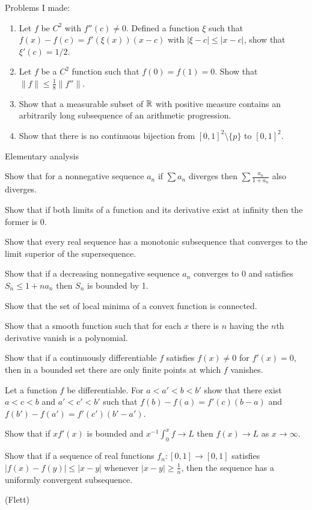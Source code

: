 \documentclass[11pt]{article}
\begin{document}
Problems I made:
\begin{enumerate}
\item Let $f$ be $C^2$ with $f''(c)\ne0$. Defined a function $\xi$ such that $f(x)-f(c)=f'(\xi(x))(x-c)$ with $|\xi-c|\le|x-c|$, show that $\xi'(c)=1/2$.
\item Let $f$ be a $C^2$ function such that $f(0)=f(1)=0$. Show that $\|f\|\le\frac18\|f''\|$.
\item Show that a measurable subset of $\mathbb{R}$ with positive measure contains an arbitrarily long subsequence of an arithmetic progression.
\item Show that there is no continuous bijection from $[0,1]^2\setminus\{p\}$ to $[0,1]^2$. %
\end{enumerate}
\bigskip

Elementary analysis
\begin{cond}
\item Show that for a nonnegative sequence $a_n$ if $\sum a_n$ diverges then $\sum\frac{a_n}{1+a_n}$ also diverges.
\item Show that if both limits of a function and its derivative exist at infinity then the former is 0.
\item Show that every real sequence has a monotonic subsequence that converges to the limit superior of the supersequence.
\item Show that if a decreasing nonnegative sequence $a_n$ converges to 0 and satisfies $S_n\le1+na_n$ then $S_n$ is bounded by 1.
\item Show that the set of local minima of a convex function is connected.
\item Show that a smooth function such that for each $x$ there is $n$ having the $n$th derivative vanish is a polynomial.
\item Show that if a continuously differentiable $f$ satisfies $f(x)\ne0$ for $f'(x)=0$, then in a bounded set there are only finite points at which $f$ vanishes.
\item Let a function $f$ be differentiable. For $a<a'<b<b'$ show that there exist $a<c<b$ and $a'<c'<b'$ such that $f(b)-f(a)=f'(c)(b-a)$ and $f(b')-f(a')=f'(c')(b'-a')$.
\item Show that if $xf'(x)$ is bounded and $x^{-1}\int_0^xf\to L$ then $f(x)\to L$ as $x\to\infty$.
\item Show that if a sequence of real functions $f_n\colon[0,1]\to[0,1]$ satisfies $|f(x)-f(y)|\le|x-y|$ whenever $|x-y|\ge\frac1n$, then the sequence has a uniformly convergent subsequence.
\item (Flett)

\end{cond}
\end{document}
